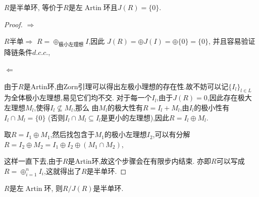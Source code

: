\begin{proposition}
    $R$是半单环, 等价于$R$是左$\operatorname{Artin}$环且$J(R)=\{0\}$.
\end{proposition}
\begin{proof}
    $\Rightarrow$ 

    $R$半单$\Rightarrow$ $\displaystyle R = \oplus_{\text{极小左理想}}I$,因此
    $\displaystyle J(R) = \oplus J(I) = \oplus \{0\} = \{0\}$,
    并且容易验证降链条件$d.c.c.$,

    $\Leftarrow$

    由于$R$是Artin环,由Zorn引理可以得出左极小理想的存在性.故不妨可以记$\{I_l\}_{l\in L}$为全体极小左理想,易见它们均不交.
    对于每一个$I_l$,由于$J(R) = 0$,因此存在极大左理想$M_l$,使得$I_l \nsubseteq M_l$,那么
    由$M_l$的极大性有$R = I_l + M_l$,由$I_l$的极小性有$I_l \cap M_l = \{0\}$
    (否则$I_l \cap M_l \subseteq I_l$是更小的左理想),因此$R = I_l \oplus M_l$.

    取$R = I_1 \oplus M_1$,然后找包含于$M_1$的极小左理想$I_2$,可以有分解$R = I_2 \oplus M_2 = I_1 \oplus I_2 \oplus (M_1 \cap M_2)$,
    
    这样一直下去,由于$R$是Artin环,故这个步骤会在有限步内结束.
    亦即$R$可以写成$R = \oplus_{i = 1}^n I_i$,这就得出了$R$是半单环.


\end{proof}
\begin{corollary}
    $R$是左$\operatorname{Artin}$环, 则$R/J(R)$是半单环.
\end{corollary}